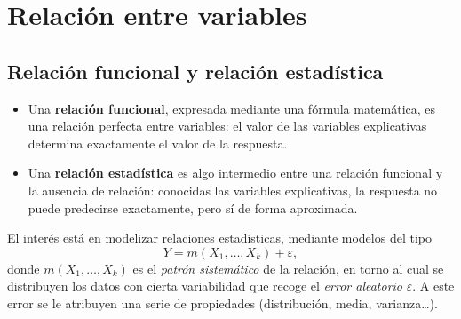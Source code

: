 \section{Relación entre variables}
\label{sec:t1-relacion}

\subsection{Relación funcional y relación estadística}

\begin{definicion}
  \begin{itemize}
    \item Una \textbf{relación funcional}, expresada mediante una fórmula matemática, es una
      relación perfecta entre variables: el valor de las variables explicativas determina
      exactamente el valor de la respuesta.
    \item Una \textbf{relación estadística} es algo intermedio entre una relación funcional y
      la ausencia de relación: conocidas las variables explicativas, la respuesta no puede
      predecirse exactamente, pero sí de forma aproximada.
  \end{itemize}
\end{definicion}

El interés está en modelizar relaciones estadísticas, mediante modelos del tipo
\begin{equation}\label{eq:t1-modelo-general}
  Y = m(X_1,\ldots,X_k) + \varepsilon ,
\end{equation}
donde $m(X_1,\ldots,X_k)$ es el \emph{patrón sistemático} de la relación, en torno al cual se
distribuyen los datos con cierta variabilidad que recoge el \emph{error aleatorio}
$\varepsilon$. A este error se le atribuyen una serie de propiedades (distribución, media,
varianza\ldots).

